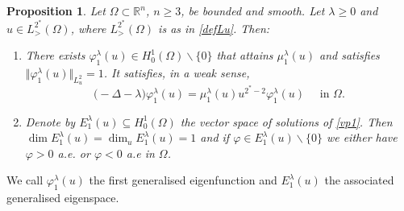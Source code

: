 \documentclass[10pt]{amsart}
\numberwithin{equation}{section}
\newcommand{\R}{\mathbb{R}}
\newcommand{\vp}{\varphi}
\newcommand{\Om}{\Omega}
\theoremstyle{plain}
\newtheorem{prop}{Proposition}[section]%
\theoremstyle{remark}
\begin{document}
\begin{prop} \label{prop:vp1}
Let $\Om \subset \R^n$, $n \ge 3$, be bounded and smooth. Let $\lambda \ge0$ and $u \in L^{2^*}_>(\Om)$, where $L^{2^*}_>(\Om)$ is as in \eqref{defLu}. Then:
\begin{enumerate}
\item There exists $\varphi_{1}^{\lambda}(u) \in H^1_0(\Om)\backslash \{0\}$ that attains $\mu_1^{\lambda}(u)$ and satisfies $\Vert \varphi_{1}^{\lambda}(u)\Vert_{L^2_u} = 1$. It satisfies, in a weak sense,
\begin{equation} \label{vp1}
\big( - \Delta - \lambda \big) \vp_{1}^{\lambda}(u) = \mu_1^{\lambda}(u) u^{2^*-2}    \vp_{1}^{\lambda}(u) \quad \text{ in } \Om. 
\end{equation}
\item Denote by $E_1^{\lambda}(u) \subseteq H^1_0(\Om)$ the vector space of solutions of \eqref{vp1}. Then $\dim  E_1^{\lambda}(u) = \dim_u  E_1^{\lambda}(u) = 1$ and if $\vp \in E_1^{\lambda}(u)\backslash \{0\}$ we either have $\vp > 0$ a.e. or $\vp < 0$ a.e in $\Om$. 
\end{enumerate}
\end{prop}
We call  $\vp_1^{\lambda}(u)$ the first generalised eigenfunction and $E_1^{\lambda}(u)$ the associated generalised eigenspace. 
\end{document}
